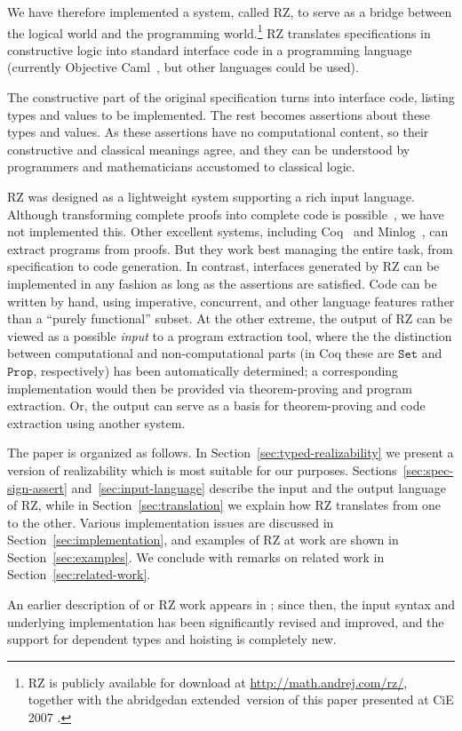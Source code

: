 
We have therefore implemented a system, called RZ, to serve as a
bridge between the logical world and the programming
world.\footnote{RZ is publicly available for download at
  \url{http://math.andrej.com/rz/}, together with \iflong
  the abridged\else an extended\fi\ version of this paper
  \iflong presented at CiE 2007 \cite{bauer+:cie07}\fi.} RZ translates
specifications in constructive logic into standard interface code in a
programming language (currently Objective Caml~\cite{ocaml}, but other
languages could be used).

The constructive part of the original specification turns into
interface code, listing types and values to be implemented. The rest
becomes assertions about these types and values. As these assertions have
no computational content, so their constructive and classical meanings
agree, and they can be understood by programmers and mathematicians
accustomed to classical logic.


RZ was designed as a lightweight system
supporting a rich input language. Although transforming complete
proofs into complete code is possible~\cite{komagata+:tr95}, we have not
implemented this. Other excellent systems, including Coq~\cite{coqart} and
Minlog~\cite{benl98:_proof_theor_work}, can
extract programs from proofs. But they work best managing the entire
task, from specification to code generation. In contrast, interfaces generated by RZ can be
implemented in any fashion as long as the assertions are satisfied.
Code can be written by hand, using imperative, concurrent, and other language features
rather than a ``purely functional'' subset. 
\iflong
At the other
extreme, the output of RZ can be viewed as a possible \emph{input} to
a program extraction tool, where the the distinction between
computational and non-computational parts (in Coq these are
$\mathtt{Set}$ and $\mathtt{Prop}$, respectively) has been
automatically determined; a corresponding implementation would then be
provided via theorem-proving and program extraction.
\else %
Or, the output can serve as a basis for theorem-proving and code
extraction using another system.
\fi

\iflong
The paper is organized as follows. In
Section~\ref{sec:typed-realizability} we present a version of
realizability which is most suitable for our purposes.
Sections~\ref{sec:spec-sign-assert} and~\ref{sec:input-language}
describe the input and the output language of RZ, while in
Section~\ref{sec:translation} we explain how RZ translates from one to
the other. Various implementation issues are discussed in
Section~\ref{sec:implementation}, and examples of RZ at work are shown
in Section~\ref{sec:examples}. We conclude with remarks on related
work in Section~\ref{sec:related-work}.
\fi %

An earlier description of or RZ work appears in \cite{bauer+:clase05};
since then, the input syntax and underlying implementation has been
significantly revised and improved, and the support for dependent types and
hoisting is completely new.

